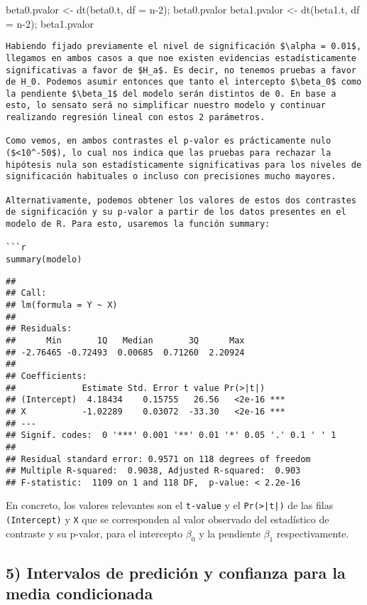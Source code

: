 \documentclass[
]{article}
\begin{document}
beta0.pvalor \textless- dt(beta0.t, df = n-2); beta0.pvalor beta1.pvalor
\textless- dt(beta1.t, df = n-2); beta1.pvalor

\begin{verbatim}
Habiendo fijado previamente el nivel de significación $\alpha = 0.01$, llegamos en ambos casos a que noe existen evidencias estadísticamente significativas a favor de $H_a$. Es decir, no tenemos pruebas a favor de H_0. Podemos asumir entonces que tanto el intercepto $\beta_0$ como la pendiente $\beta_1$ del modelo serán distintos de 0. En base a esto, lo sensato será no simplificar nuestro modelo y continuar realizando regresión lineal con estos 2 parámetros.

Como vemos, en ambos contrastes el p-valor es prácticamente nulo ($<10^-50$), lo cual nos indica que las pruebas para rechazar la hipótesis nula son estadísticamente significativas para los niveles de significación habituales o incluso con precisiones mucho mayores.

Alternativamente, podemos obtener los valores de estos dos contrastes de significación y su p-valor a partir de los datos presentes en el modelo de R. Para esto, usaremos la función summary:

```r
summary(modelo)
\end{verbatim}

\begin{verbatim}
## 
## Call:
## lm(formula = Y ~ X)
## 
## Residuals:
##      Min       1Q   Median       3Q      Max 
## -2.76465 -0.72493  0.00685  0.71260  2.20924 
## 
## Coefficients:
##             Estimate Std. Error t value Pr(>|t|)    
## (Intercept)  4.18434    0.15755   26.56   <2e-16 ***
## X           -1.02289    0.03072  -33.30   <2e-16 ***
## ---
## Signif. codes:  0 '***' 0.001 '**' 0.01 '*' 0.05 '.' 0.1 ' ' 1
## 
## Residual standard error: 0.9571 on 118 degrees of freedom
## Multiple R-squared:  0.9038, Adjusted R-squared:  0.903 
## F-statistic:  1109 on 1 and 118 DF,  p-value: < 2.2e-16
\end{verbatim}

En concreto, los valores relevantes son el \texttt{t-value} y el
\texttt{Pr(>|t|)} de las filas \texttt{(Intercept)} y \texttt{X} que se
corresponden al valor observado del estadístico de contraste y su
p-valor, para el intercepto \(\beta_0\) y la pendiente \(\beta_1\)
respectivamente.

\hypertarget{intervalos-de-prediciuxf3n-y-confianza-para-la-media-condicionada}{%
\subsection{5) Intervalos de predición y confianza para la media
condicionada}\label{intervalos-de-prediciuxf3n-y-confianza-para-la-media-condicionada}}
\end{document}
